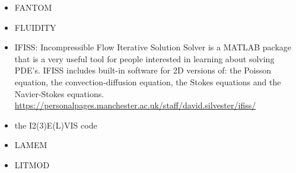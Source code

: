\begin{itemize}
\cite{modm03}
\cite{omma06} 
\cite{moql07}
\cite{dyrm07}
\cite{onlg08}
\cite{pyeg10}
\cite{legu11}
\cite{lega12}


\item FANTOM

\cite{thie11}
\cite{alht11}
\cite{alht12}
\cite{alhf13}
\cite{erhv14}
\cite{thsh14}
\cite{erhv15}
\cite{erhv19}



\item FLUIDITY
\cite{dawk11}
\cite{gagd14}

\item IFISS: Incompressible Flow Iterative Solution Solver is a
MATLAB package that is a very useful tool for people interested in
learning about solving PDE’s.
IFISS includes built-in software for 2D versions of:
the Poisson equation, the convection-diffusion equation, the Stokes equations
and the Navier-Stokes equations.\\
\url{https://personalpages.manchester.ac.uk/staff/david.silvester/ifiss/}



\item the I2(3)E(L)VIS code

\cite{geyu03}\cite{geyu03b}\cite{geur03}
\cite{geym04}\cite{geys04}\cite{gepm04}
\cite{buge05}
\cite{bbeg06}\cite{gest06}\cite{gogc06}\cite{gecy06}
\cite{geyu07}\cite{gogc07}
\cite{scbe08}\cite{gecy08}\cite{uegs08}\cite{fagc08}\cite{zgyh09}
\cite{gefc09}
\cite{gerya2010}\cite{nigm10}
\cite{dugm11}\cite{dumg11}\cite{lixg11}\cite{gery11}\cite{geme11}
\cite{crsg12}\cite{dugk12}\cite{lixg12}
\cite{lixg13}\cite{nabg13}\cite{magc13}\cite{digd13a}\cite{digd13b}\cite{zhgt13}\cite{dyge13}\cite{gemd13}\cite{mana13}
\cite{dugs14}\cite{puge14}\cite{rugb14}\cite{voge14b}\cite{bagb14}\cite{lige14}\cite{stjm14}\cite{malg14}
\cite{buge14}\cite{gosk14}\cite{bagb14}\cite{vamd14}
\cite{duay15}\cite{uewg15}\cite{rula15}\cite{gesb15}\cite{rula15}
\cite{kobc16}\cite{magc16}\cite{fige16}

\item LAMEM
\cite{scbe08}
\cite{kamm10}
\cite{lemk11}
\cite{may12}
\cite{lesh13}
\cite{cokm14}
\cite{feka14a}
\cite{feka14b}
\cite{puka15}
\cite{feka15}
\cite{cofk15}
\cite{kapb16}

\item LITMOD
\cite{fuac09}
\cite{affr08}
\cite{afrf07}
\cite{fufa10}


\end{itemize}
